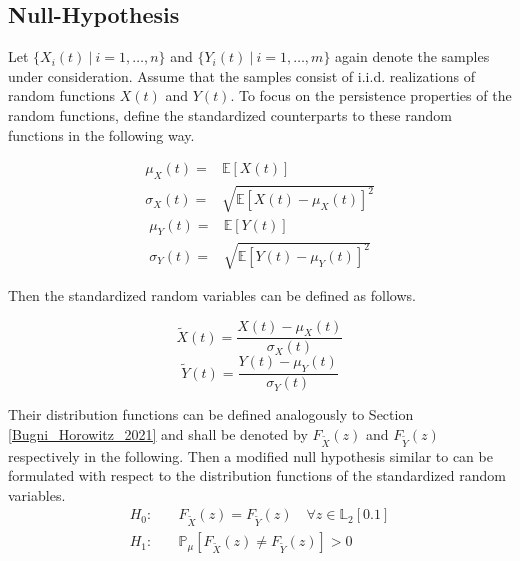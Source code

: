 \documentclass[12pt, a4paper]{article}
\theoremstyle{MAstyle} \newtheorem{assumption}{Assumption}[section]
\theoremstyle{MAstyle} \newtheorem{definition}{Definition}[section]
\theoremstyle{MAstyle} \newtheorem{theorem}{Theorem}[section]
\begin{document}
		\subsection{Null-Hypothesis}
		Let $\{X_i(t) \ | \  i = 1, \dots, n\}$ and $\{Y_i(t) \ | \  i = 1, \dots, m\}$ again denote the samples under consideration. Assume that the samples consist of i.i.d. realizations of random functions $X(t)$ and $Y(t)$.
		To focus on the persistence properties of the random functions, define the standardized counterparts to these random functions in the following way.
		\begin{multicols}{2}
			\noindent
			\begin{equation*}
				\begin{split}
					\mu_{X}(t) = &\mathbb{E}\left[X(t)\right] \\
					\sigma_{X}(t) = &\sqrt{\mathbb{E}\left[X(t) - \mu_{X}(t)\right]^2}
				\end{split}
			\end{equation*}
			\begin{equation}
				\begin{split}
					\mu_{Y}(t) = &\mathbb{E}\left[Y(t)\right] \\
					\sigma_{Y}(t) = &\sqrt{\mathbb{E}\left[Y(t) - \mu_{Y}(t)\right]^2}
				\end{split}
			\end{equation}
		\end{multicols}
		Then the standardized random variables can be defined as follows.
		\begin{multicols}{2}
			\noindent
			\begin{equation*}
				\tilde{X}(t) = \frac{X(t) - \mu_{X}(t)}{\sigma_{X}(t)}
			\end{equation*}
			\begin{equation}
				\tilde{Y}(t) = \frac{Y(t) - \mu_{Y}(t)}{\sigma_{Y}(t)}
			\end{equation}
		\end{multicols}
		Their distribution functions can be defined analogously to Section \ref{Bugni_Horowitz_2021} and shall be denoted by $F_{\tilde{X}}(z)$ and $F_{\tilde{Y}}(z)$ respectively in the following. Then a modified null hypothesis similar to \cite{bugni_permutation_2021} can be formulated with respect to the distribution functions of the standardized random variables.
		\begin{equation}
			\begin{split}
				H_0: \quad &F_{\tilde{X}}(z) = F_{\tilde{Y}}(z) \quad \forall z \in \mathbb{L}_2[0.1] \\
				H_1: \quad &\mathbb{P}_{\mu}\left[F_{\tilde{X}}(z) \neq F_{\tilde{Y}}(z)\right] > 0
			\end{split}
		\end{equation}
\end{document}
